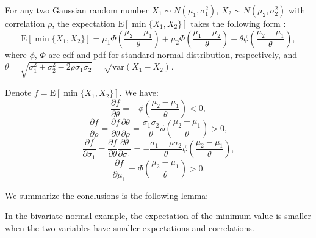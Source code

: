 \documentclass[opre,sglanonrev]{informs4}
\begin{document}

For any two Gaussian random number $X_1\sim N(\mu_1,\sigma^2_1)$, $X_2\sim N(\mu_2,\sigma^2_2)$ with correlation $\rho$, the expectation $\text{E}[\min\{X_1, X_2\}]$ takes the following form \citep{clark1961greatest}:
$$
\text{E}[\min\{X_1, X_2\}] = \mu_1\Phi(\frac{\mu_2-\mu_1}{\theta}) + \mu_2\Phi(\frac{\mu_1-\mu_2}{\theta}) - \theta \phi(\frac{\mu_2-\mu_1}{\theta} ),
$$
where $\phi$, $\Phi$ are cdf and pdf for standard normal distribution, respectively, and $\theta = \sqrt{\sigma^2_1+\sigma^2_2-2\rho \sigma_1\sigma_2} = \sqrt{\text{var}(X_1-X_2)}$.

Denote $f=\text{E}[\min\{X_1, X_2\}] $. We have:
\begin{equation}
	\frac{\partial f}{\partial \theta} = -\phi(\frac{\mu_2-\mu_1}{\theta})<0,
\end{equation}
\begin{equation}
	\label{rho}
	\frac{\partial f}{\partial \rho} = \frac{\partial f}{\partial \theta} \frac{\partial \theta}{\partial \rho} =  \frac{\sigma_1\sigma_2}{\theta}\phi(\frac{\mu_2-\mu_1}{\theta})>0,
\end{equation}
\begin{equation}
	\label{sigma}
	\frac{\partial f}{\partial \sigma_1} = \frac{\partial f}{\partial \theta} \frac{\partial \theta}{\partial \sigma_1} = -\frac{\sigma_1-\rho\sigma_2}{\theta} \phi(\frac{\mu_2-\mu_1}{\theta}),
\end{equation}
\begin{equation}
	\label{mu}
	\frac{\partial f}{\partial \mu_1} = \Phi( \frac{\mu_2-\mu_1}{\theta})>0.
\end{equation}

We summarize the conclusions is the following lemma:
\begin{lemma}
	In the bivariate normal example, the expectation of the minimum value is smaller when the two variables have smaller expectations and correlations.
\end{lemma}
\end{document}
